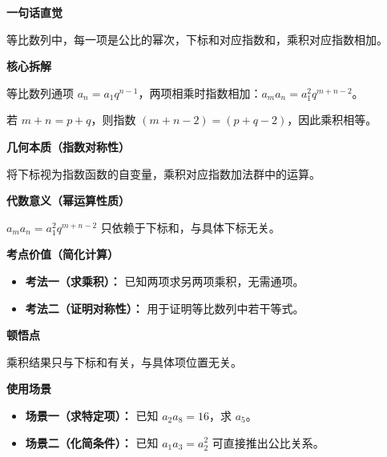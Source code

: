 \begin{explanationbox}
\textbf{\textcolor{CExplanation}{一句话直觉}}

等比数列中，每一项是公比的幂次，下标和对应指数和，乘积对应指数相加。

\medskip
\textbf{\textcolor{CExplanation}{核心拆解}}
\begin{description}[style=nextline, leftmargin=2.8em, labelsep=0.5em, itemsep=0.45em]
    \item[\textbf{要点一（比例关系）：}] 等比数列通项 $a_n = a_1 q^{n-1}$，两项相乘时指数相加：$a_m a_n = a_1^2 q^{m+n-2}$。
    \item[\textbf{要点二（指数和相等）：}] 若 $m+n=p+q$，则指数 $(m+n-2)=(p+q-2)$，因此乘积相等。
\end{description}

\medskip
\textbf{\textcolor{CExplanation}{几何本质（指数对称性）}}

将下标视为指数函数的自变量，乘积对应指数加法群中的运算。

\medskip
\textbf{\textcolor{CExplanation}{代数意义（幂运算性质）}}

$a_m a_n = a_1^2 q^{m+n-2}$ 只依赖于下标和，与具体下标无关。

\medskip
\textbf{\textcolor{CExplanation}{考点价值（简化计算）}}
\begin{itemize}[leftmargin=*, itemsep=0.5em, topsep=0.4em]
    \item \textbf{考法一（求乘积）：} 已知两项求另两项乘积，无需通项。
    \item \textbf{考法二（证明对称性）：} 用于证明等比数列中若干等式。
\end{itemize}

\medskip
\textbf{\textcolor{CExplanation}{顿悟点}}

乘积结果只与下标和有关，与具体项位置无关。

\medskip
\textbf{\textcolor{CExplanation}{使用场景}}
\begin{itemize}[leftmargin=*, itemsep=0.5em, topsep=0.4em]
    \item \textbf{场景一（求特定项）：} 已知 $a_2 a_8=16$，求 $a_5$。
    \item \textbf{场景二（化简条件）：} 已知 $a_1 a_3 = a_2^2$ 可直接推出公比关系。
\end{itemize}
\end{explanationbox}
